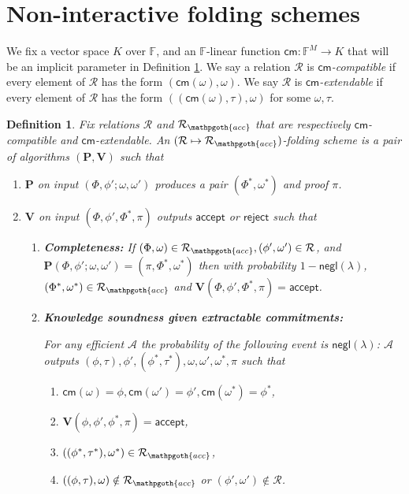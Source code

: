 \documentclass[11pt]{article} %
\newcommand{\F}{\ensuremath{\mathbb F}\xspace}
\newcommand{\adv}{\ensuremath{\mathcal A}\xspace}
\newcommand{\cm}{\ensuremath{\mathsf{cm}}\xspace}
\newcommand{\negl}{\ensuremath{\mathsf{negl}(\lambda)}\xspace}
\newcommand{\rej}{\ensuremath{\mathsf{reject}}\xspace}
\newcommand{\acc}{\ensuremath{\mathsf{accept}}\xspace}
\newcommand{\prv}{\ensuremath{\mathsf{\mathbf{P}}}\xspace}
\newcommand{\prf}{\ensuremath{\mathsf{\pi}}\xspace}
\newcommand{\inst}{\ensuremath{\phi}\xspace}
\newcommand{\wit}{\ensuremath{\mathsf{\omega}}\xspace}
\newcommand{\ver}{\ensuremath{\mathsf{\mathbf{V}}}\xspace}
\newcommand{\rel}{\ensuremath{\mathcal{R}}\xspace}
\newtheorem{dfn}[lemma]{Definition}
\newcommand{\instt}{\ensuremath{\Phi^*}\xspace}
\newcommand{\insttbase}{\ensuremath{\Phi}\xspace}
\newcommand{\accscheme}[2]{$(#1\mapsto #2)$-folding scheme\xspace}
\newcommand{\accrel}{\ensuremath{\rel_{\mathpgoth{acc}}}\xspace}
\newcommand{\inststar}{\ensuremath{\inst^*}\xspace}
\newcommand{\witstar}{\ensuremath{\wit^*}\xspace}
\begin{document}
\section{Non-interactive folding schemes}\label{sec:folding}
We fix a vector space $K$ over \F, and an $\F$-linear function $\cm:\F^M\to K$ that will be an implicit parameter in Definition \ref{dfn:accschme}.
We say a relation \rel is \emph{\cm-compatible} if every element of \rel has the form $(\cm(\wit),\wit)$.
We say \rel is \emph{\cm-extendable} if every element of \rel has the form $((\cm(\wit),\tau),\wit)$ for some $\wit,\tau$.
\begin{dfn}\label{dfn:accschme}
Fix relations \rel and \accrel that are respectively \cm-compatible and \cm-extendable. An \emph{\accscheme{\rel}{\accrel}} is a pair of algorithms $(\prv, \ver)$
such that

\begin{enumerate}
 \item \prv on input $(\insttbase,\inst';\wit,\wit')$ produces a pair $(\instt,\wit^*)$ and proof \prf .
 \item \ver on input $(\insttbase,\inst',\instt,\prf)$ outputs \acc or \rej such that
\begin{enumerate}
 \item \textbf{Completeness:} If $(\insttbase,\wit)\in \accrel, (\inst',\wit')\in \rel$, and $\prv(\insttbase,\inst';\wit,\wit')=(\prf,\instt,\witstar)$ then with probability $1-\negl$, $(\instt,\witstar)\in \accrel$ and $\ver(\insttbase,\inst',\instt,\prf)=\acc$.
\item \textbf{Knowledge soundness  given extractable commitments:}

For any efficient \adv the probability of the following event is \negl:
\adv outputs $(\inst,\tau),\inst',(\inststar,\tau^*),\wit,\wit',\witstar,\prf$
such that 
\begin{enumerate}
\item $\cm(\wit)=\inst,\cm(\wit')=\inst',\cm(\witstar)=\inststar$, 
\item $\ver(\inst,\inst',\inststar,\prf)=\acc$,
\item $((\inststar,\tau^*),\witstar)\in\accrel$, 
\item $((\inst,\tau),\wit)\notin\accrel$ or $(\inst',\wit')\notin \rel$.
\end{enumerate}

\end{enumerate}
\end{enumerate}
\end{dfn}
\end{document}
